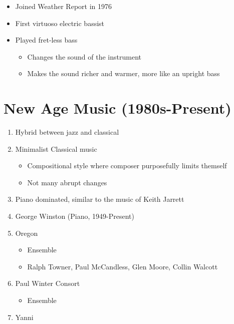 \documentclass[]{article}
\providecommand{\tightlist}{%
  \setlength{\itemsep}{0pt}\setlength{\parskip}{0pt}}
\begin{document}
\begin{enumerate}
  \begin{itemize}
  \tightlist
  \item
    Joined Weather Report in 1976
  \item
    First virtuoso electric bassist
  \item
    Played fret-less bass

    \begin{itemize}
    \tightlist
    \item
      Changes the sound of the instrument
    \item
      Makes the sound richer and warmer, more like an upright bass
    \end{itemize}
  \end{itemize}
\end{enumerate}

\section{New Age Music
(1980s-Present)}\label{new-age-music-1980s-present}

\begin{enumerate}
\def\labelenumi{\arabic{enumi}.}
\tightlist
\item
  Hybrid between jazz and classical
\item
  Minimalist Classical music

  \begin{itemize}
  \tightlist
  \item
    Compositional style where composer purposefully limits themself
  \item
    Not many abrupt changes
  \end{itemize}
\item
  Piano dominated, similar to the music of Keith Jarrett
\item
  George Winston (Piano, 1949-Present)
\item
  Oregon

  \begin{itemize}
  \tightlist
  \item
    Ensemble
  \item
    Ralph Towner, Paul McCandless, Glen Moore, Collin Walcott
  \end{itemize}
\item
  Paul Winter Consort

  \begin{itemize}
  \tightlist
  \item
    Ensemble
  \end{itemize}
\item
  Yanni
\end{enumerate}
\end{document}
